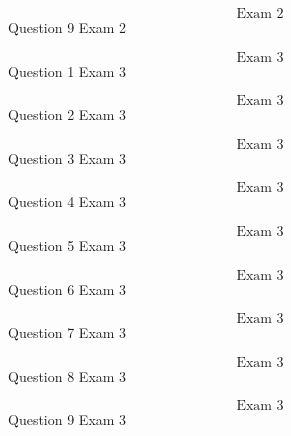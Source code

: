 \documentclass{article}
\begin{document}
    $$\text{Exam 2}$$
    Question 9 Exam 2
    \pagebreak


    $$\text{Exam 3}$$
    Question 1 Exam 3\\
    \pagebreak

    $$\text{Exam 3}$$
    Question 2 Exam 3
    \pagebreak

    $$\text{Exam 3}$$
    Question 3 Exam 3
    \pagebreak

    $$\text{Exam 3}$$
    Question 4 Exam 3
    \pagebreak

    $$\text{Exam 3}$$
    Question 5 Exam 3
    \pagebreak

    $$\text{Exam 3}$$
    Question 6 Exam 3
    \pagebreak

    $$\text{Exam 3}$$
    Question 7 Exam 3
    \pagebreak

    $$\text{Exam 3}$$
    Question 8 Exam 3
    \pagebreak

    $$\text{Exam 3}$$
    Question 9 Exam 3
    \pagebreak
\end{document}

